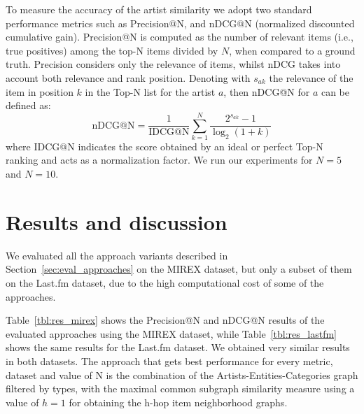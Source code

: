 To measure the accuracy of the artist similarity we adopt two standard performance metrics such as Precision@N, and nDCG@N (normalized discounted cumulative gain).
Precision@N is computed as the number of relevant items (i.e., true positives) among the top-N items divided by $N$, when compared to a ground truth.
Precision considers only the relevance of items, whilst nDCG takes into account both relevance and rank position. Denoting with  $s_{ak}$ the relevance of the item in position $k$ in the Top-N list for the artist $a$, then nDCG@N for $a$ can be defined as:
\begin{equation}\label{eq:recall}
\text{nDCG@N} = \frac{1 }{\text{IDCG@N}} \sum^N_{k=1} \frac{ 2^{ s_{ak}} -1 }{\log_2 (1+k)}
\end{equation}
where IDCG@N indicates the score obtained by an ideal or perfect Top-N ranking and acts as a normalization factor. We run our experiments for $N=5$ and $N=10$.

\section{Results and discussion} %
\label{sec:results}
We evaluated all the approach variants described in Section~\ref{sec:eval_approaches} on the MIREX dataset, but only a subset of them on the Last.fm dataset, due to the high computational cost of some of the approaches.

Table~\ref{tbl:res_mirex} shows the Precision@N and nDCG@N results of the evaluated approaches using the MIREX dataset, while Table~\ref{tbl:res_lastfm} shows the same results for the Last.fm dataset. We obtained very similar results in both datasets. The approach that gets best performance for every metric, dataset and value of N is the combination of the Artists-Entities-Categories graph filtered by types, with the maximal common subgraph similarity measure using a value of $h=1$ for obtaining the h-hop item neighborhood graphs.

